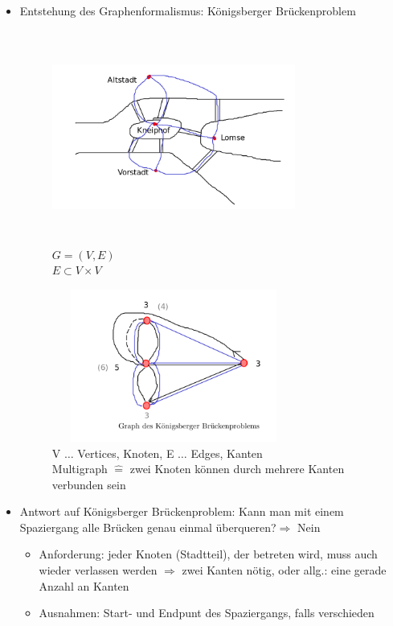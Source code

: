 \documentclass[11pt, fleqn]{scrreprt}
\begin{document}
\begin{itemize}
	\item Entstehung des Graphenformalismus: Königsberger Brückenproblem
	
	\begin{figure}[htbp]
		\begin{minipage}[t]{8cm}
			\centering
			\vspace{0cm}
			\includegraphics[width=8cm,height=7cm,keepaspectratio]{./Pictures/Koenigsberg.png}\\
			$G = (V, E)$\\
			$E \subset V \times V$
		\end{minipage}
		\begin{minipage}[t]{8cm}
			\vspace{0cm}
			\includegraphics[width=8cm,height=5cm,keepaspectratio]{./Pictures/Brueckengraph.png}\\
			V $\dots$ Vertices, Knoten, E $\dots$ Edges, Kanten\\
			Multigraph $\widehat{=}$ zwei Knoten können durch mehrere Kanten verbunden sein
		\end{minipage}
	\end{figure}

	\item Antwort auf Königsberger Brückenproblem: \glqq Kann man mit einem Spaziergang alle Brücken genau einmal überqueren?\grqq $\Rightarrow$ Nein
	\begin{itemize}
		\item Anforderung: jeder Knoten (Stadtteil), der betreten wird, muss auch wieder verlassen werden $\Rightarrow$ zwei Kanten nötig, oder allg.: eine gerade Anzahl an Kanten
		\item Ausnahmen: Start- und Endpunt des Spaziergangs, falls verschieden
	\end{itemize}
\end{itemize}
\end{document}
